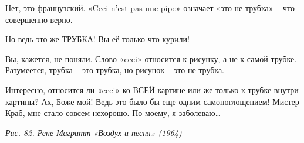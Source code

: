 \documentclass[../main.tex]{subfiles}
\begin{document}
\begin{dialogue}
 Нет, это французский. «Ceci n'est pas une pipe» означает «это не трубка» \--- что совершенно верно.

 Но ведь это же ТРУБКА! Вы её только что курили!

 Вы, кажется, не поняли. Слово «ceci» относится к рисунку, а не к самой трубке. Разумеется, трубка \--- это трубка, но рисунок \--- это не трубка.

 Интересно, относится ли «ceci» ко ВСЕЙ картине или же только к трубке внутри картины? Ах, Боже мой! Ведь это было бы еще одним самопоглощением! Мистер Краб, мне стало совсем нехорошо. По-моему, я заболеваю\ldots{}

\emph{Рис. 82. Рене Магритт «Воздух и песня» (1964)}

\end{dialogue}
\end{document}
